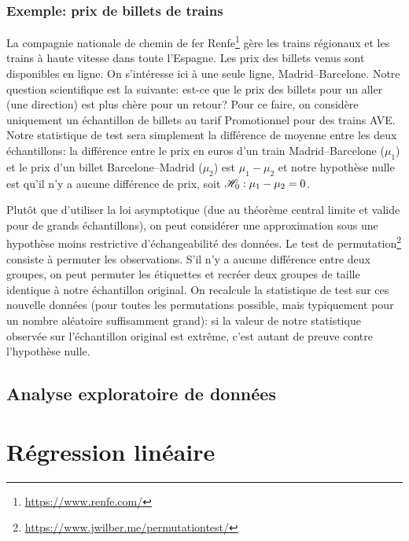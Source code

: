 \documentclass[
  11pt,
  letterpaper,
]{book}
\renewcommand{\href}[2]{#2\footnote{\url{#1}}}
\begin{document}
\hypertarget{exemple-prix-de-billets-de-trains}{%
\subsection{Exemple: prix de billets de trains}\label{exemple-prix-de-billets-de-trains}}

La compagnie nationale de chemin de fer \href{https://www.renfe.com/}{Renfe} gère les trains régionaux et les trains à haute vitesse dans toute l'Espagne. Les prix des billets venus sont disponibles en ligne. On s'intéresse ici à une seule ligne, Madrid--Barcelone. Notre question scientifique est la suivante: est-ce que le prix des billets pour un aller (une direction) est plus chère pour un retour? Pour ce faire, on considère uniquement un échantillon de billets au tarif Promotionnel pour des trains AVE. Notre statistique de test sera simplement la différence de moyenne entre les deux échantillons: la différence entre le prix en euros d'un train Madrid--Barcelone (\(\mu_1\)) et le prix d'un billet Barcelone--Madrid (\(\mu_2\)) est \(\mu_1-\mu_2\) et notre hypothèse nulle est qu'il n'y a aucune différence de prix, soit \(\mathscr{H}_0: \mu_1-\mu_2=0\).

Plutôt que d'utiliser la loi asymptotique (due au théorème central limite et valide pour de grands échantillons), on peut considérer une approximation sous une hypothèse moins restrictive d'échangeabilité des données. Le \href{https://www.jwilber.me/permutationtest/}{test de permutation} consiste à permuter les observations. S'il n'y a aucune différence entre deux groupes, on peut permuter les étiquettes et recréer deux groupes de taille identique à notre échantillon original. On recalcule la statistique de test sur ces nouvelle données (pour toutes les permutations possible, mais typiquement pour un nombre aléatoire suffisamment grand): si la valeur de notre statistique observée sur l'échantillon original est extrême, c'est autant de preuve contre l'hypothèse nulle.

\hypertarget{analyse-exploratoire-de-donnuxe9es}{%
\section{Analyse exploratoire de données}\label{analyse-exploratoire-de-donnuxe9es}}

\hypertarget{regression-lineaire}{%
\chapter{Régression linéaire}\label{regression-lineaire}}
\end{document}
